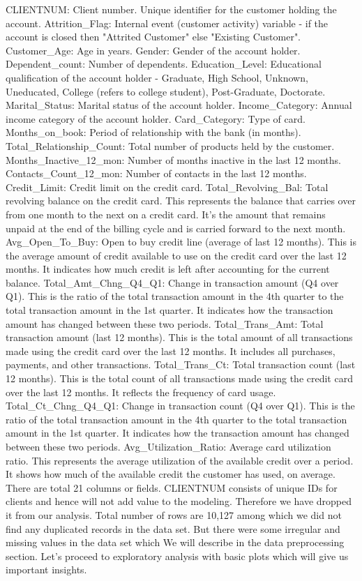 \documentclass[10pt,a4paper]{style}
\begin{document}
CLIENTNUM: Client number. Unique identifier for the customer holding the account.
Attrition\_Flag: Internal event (customer activity) variable - if the account is closed then "Attrited Customer" else "Existing Customer".
Customer\_Age: Age in years.
Gender: Gender of the account holder.
Dependent\_count: Number of dependents.
Education\_Level: Educational qualification of the account holder - Graduate, High School, Unknown, Uneducated, College (refers to college student), Post-Graduate, Doctorate.
Marital\_Status: Marital status of the account holder.
Income\_Category: Annual income category of the account holder.
Card\_Category: Type of card.
Months\_on\_book: Period of relationship with the bank (in months).
Total\_Relationship\_Count: Total number of products held by the customer.
Months\_Inactive\_12\_mon: Number of months inactive in the last 12 months.
Contacts\_Count\_12\_mon: Number of contacts in the last 12 months.
Credit\_Limit: Credit limit on the credit card.
Total\_Revolving\_Bal: Total revolving balance on the credit card. This represents the balance that carries over from one month to the next on a credit card. It's the amount that remains unpaid at the end of the billing cycle and is carried forward to the next month.
Avg\_Open\_To\_Buy: Open to buy credit line (average of last 12 months). This is the average amount of credit available to use on the credit card over the last 12 months. It indicates how much credit is left after accounting for the current balance.
Total\_Amt\_Chng\_Q4\_Q1: Change in transaction amount (Q4 over Q1). This is the ratio of the total transaction amount in the 4th quarter to the total transaction amount in the 1st quarter. It indicates how the transaction amount has changed between these two periods.
Total\_Trans\_Amt: Total transaction amount (last 12 months). This is the total amount of all transactions made using the credit card over the last 12 months. It includes all purchases, payments, and other transactions.
Total\_Trans\_Ct: Total transaction count (last 12 months). This is the total count of all transactions made using the credit card over the last 12 months. It reflects the frequency of card usage.
Total\_Ct\_Chng\_Q4\_Q1: Change in transaction count (Q4 over Q1). This is the ratio of the total transaction amount in the 4th quarter to the total transaction amount in the 1st quarter. It indicates how the transaction amount has changed between these two periods.
Avg\_Utilization\_Ratio: Average card utilization ratio. This represents the average utilization of the available credit over a period. It shows how much of the available credit the customer has used, on average. There are total 21 columns or fields. CLIENTNUM consists of unique IDs for clients and hence will not add value to the modeling. Therefore we have dropped it from our analysis. Total number of rows are 10,127 among which we did not find any duplicated records in the data set. But there were some irregular and missing values in the data set which We will describe in the data preprocessing section. Let's proceed to exploratory analysis with basic plots which will give us important insights.
\end{document}
